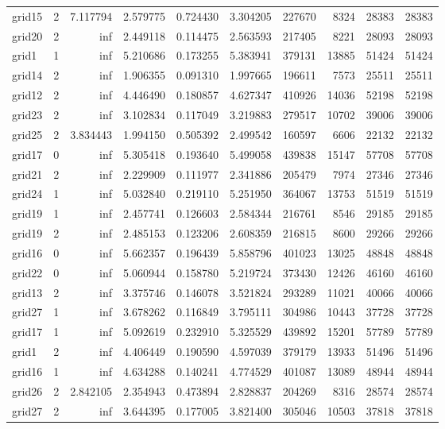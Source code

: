 \begin{longtable}{|l|r|r|r|r|r|r|r|r|r|}
grid15 & 2 & 7.117794 & 2.579775 & 0.724430 & 3.304205 & 227670 & 8324 & 28383 & 28383 \\
grid20 & 2 & inf & 2.449118 & 0.114475 & 2.563593 & 217405 & 8221 & 28093 & 28093 \\
grid1 & 1 & inf & 5.210686 & 0.173255 & 5.383941 & 379131 & 13885 & 51424 & 51424 \\
grid14 & 2 & inf & 1.906355 & 0.091310 & 1.997665 & 196611 & 7573 & 25511 & 25511 \\
grid12 & 2 & inf & 4.446490 & 0.180857 & 4.627347 & 410926 & 14036 & 52198 & 52198 \\
grid23 & 2 & inf & 3.102834 & 0.117049 & 3.219883 & 279517 & 10702 & 39006 & 39006 \\
grid25 & 2 & 3.834443 & 1.994150 & 0.505392 & 2.499542 & 160597 & 6606 & 22132 & 22132 \\
grid17 & 0 & inf & 5.305418 & 0.193640 & 5.499058 & 439838 & 15147 & 57708 & 57708 \\
grid21 & 2 & inf & 2.229909 & 0.111977 & 2.341886 & 205479 & 7974 & 27346 & 27346 \\
grid24 & 1 & inf & 5.032840 & 0.219110 & 5.251950 & 364067 & 13753 & 51519 & 51519 \\
grid19 & 1 & inf & 2.457741 & 0.126603 & 2.584344 & 216761 & 8546 & 29185 & 29185 \\
grid19 & 2 & inf & 2.485153 & 0.123206 & 2.608359 & 216815 & 8600 & 29266 & 29266 \\
grid16 & 0 & inf & 5.662357 & 0.196439 & 5.858796 & 401023 & 13025 & 48848 & 48848 \\
grid22 & 0 & inf & 5.060944 & 0.158780 & 5.219724 & 373430 & 12426 & 46160 & 46160 \\
grid13 & 2 & inf & 3.375746 & 0.146078 & 3.521824 & 293289 & 11021 & 40066 & 40066 \\
grid27 & 1 & inf & 3.678262 & 0.116849 & 3.795111 & 304986 & 10443 & 37728 & 37728 \\
grid17 & 1 & inf & 5.092619 & 0.232910 & 5.325529 & 439892 & 15201 & 57789 & 57789 \\
grid1 & 2 & inf & 4.406449 & 0.190590 & 4.597039 & 379179 & 13933 & 51496 & 51496 \\
grid16 & 1 & inf & 4.634288 & 0.140241 & 4.774529 & 401087 & 13089 & 48944 & 48944 \\
grid26 & 2 & 2.842105 & 2.354943 & 0.473894 & 2.828837 & 204269 & 8316 & 28574 & 28574 \\
grid27 & 2 & inf & 3.644395 & 0.177005 & 3.821400 & 305046 & 10503 & 37818 & 37818 \\

\end{longtable}
